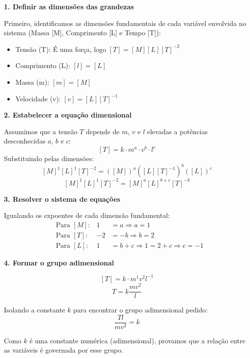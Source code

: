
\textbf{1. Definir as dimensões das grandezas}

Primeiro, identificamos as dimensões fundamentais de cada variável envolvida no sistema (Massa [M], Comprimento [L] e Tempo [T]):
\begin{itemize}
    \item Tensão (T): É uma força, logo $[T] = [M][L][T]^{-2}$
    \item Comprimento (L): $[l] = [L]$
    \item Massa (m): $[m] = [M]$
    \item Velocidade (v): $[v] = [L][T]^{-1}$
\end{itemize}

\textbf{2. Estabelecer a equação dimensional}

Assumimos que a tensão $T$ depende de $m$, $v$ e $l$ elevadas a potências desconhecidas $a$, $b$ e $c$:
\[
    [T] = k \cdot m^a \cdot v^b \cdot l^c
\]
Substituindo pelas dimensões:
\[
    [M]^1[L]^1[T]^{-2} = ([M])^a ([L][T]^{-1})^b ([L])^c
\]
\[
    [M]^1[L]^1[T]^{-2} = [M]^a [L]^{b+c} [T]^{-b}
\]

\textbf{3. Resolver o sistema de equações}

Igualando os expoentes de cada dimensão fundamental:
\begin{align*}
    &\text{Para } [M]: & 1 &= a \Rightarrow a = 1 \\
    &\text{Para } [T]: & -2 &= -b \Rightarrow b = 2 \\
    &\text{Para } [L]: & 1 &= b + c \Rightarrow 1 = 2 + c \Rightarrow c = -1
\end{align*}

\textbf{4. Formar o grupo adimensional}

\[
    [T] = k \cdot m^1 v^2 l^{-1}
\]
\[
    T = k \frac{mv^2}{l}
\]

Isolando a constante $k$ para encontrar o grupo adimensional pedido:
\[
    \frac{Tl}{mv^2} = k
\]

Como $k$ é uma constante numérica (adimensional), provamos que a relação entre as variáveis é governada por esse grupo.
